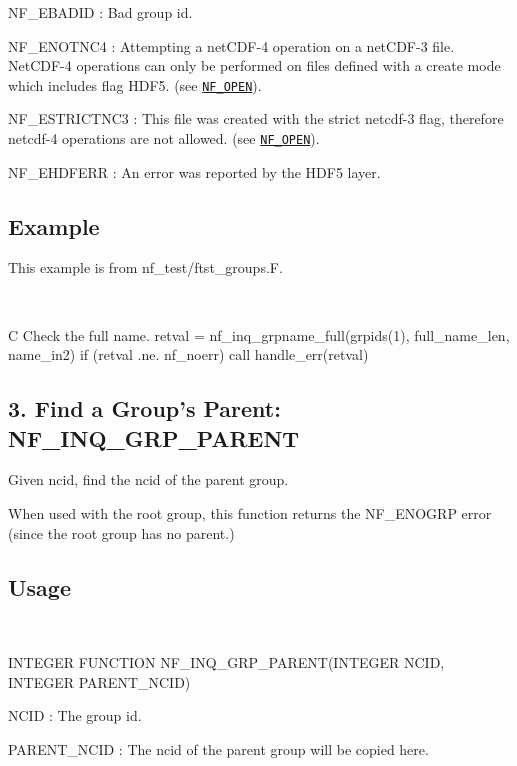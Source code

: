 {\ttfamily N\+F\+\_\+\+E\+B\+A\+D\+ID} \+: Bad group id.

{\ttfamily N\+F\+\_\+\+E\+N\+O\+T\+N\+C4} \+: Attempting a net\+C\+D\+F-\/4 operation on a net\+C\+D\+F-\/3 file. Net\+C\+D\+F-\/4 operations can only be performed on files defined with a create mode which includes flag H\+D\+F5. (see \href{#NF_005fOPEN}{\tt N\+F\+\_\+\+O\+P\+EN}).

{\ttfamily N\+F\+\_\+\+E\+S\+T\+R\+I\+C\+T\+N\+C3} \+: This file was created with the strict netcdf-\/3 flag, therefore netcdf-\/4 operations are not allowed. (see \href{#NF_005fOPEN}{\tt N\+F\+\_\+\+O\+P\+EN}).

{\ttfamily N\+F\+\_\+\+E\+H\+D\+F\+E\+RR} \+: An error was reported by the H\+D\+F5 layer.

\subsection*{Example }

This example is from nf\+\_\+test/ftst\+\_\+groups.\+F.

 

C Check the full name. retval = nf\+\_\+inq\+\_\+grpname\+\_\+full(grpids(1), full\+\_\+name\+\_\+len, name\+\_\+in2) if (retval .ne. nf\+\_\+noerr) call handle\+\_\+err(retval)\hypertarget{nc_f77_interface_guide_f77_NF-INQ-GRP-PARENT}{}\subsection{3. Find a Group’s Parent\+: N\+F\+\_\+\+I\+N\+Q\+\_\+\+G\+R\+P\+\_\+\+P\+A\+R\+E\+N\+T }\label{nc_f77_interface_guide_f77_NF-INQ-GRP-PARENT}
Given ncid, find the ncid of the parent group.

When used with the root group, this function returns the N\+F\+\_\+\+E\+N\+O\+G\+RP error (since the root group has no parent.)

\subsection*{Usage }

 

I\+N\+T\+E\+G\+ER F\+U\+N\+C\+T\+I\+ON N\+F\+\_\+\+I\+N\+Q\+\_\+\+G\+R\+P\+\_\+\+P\+A\+R\+E\+N\+T(\+I\+N\+T\+E\+G\+E\+R N\+C\+I\+D, I\+N\+T\+E\+G\+E\+R P\+A\+R\+E\+N\+T\+\_\+\+N\+C\+I\+D)

{\ttfamily N\+C\+ID} \+: The group id.

{\ttfamily P\+A\+R\+E\+N\+T\+\_\+\+N\+C\+ID} \+: The ncid of the parent group will be copied here.

